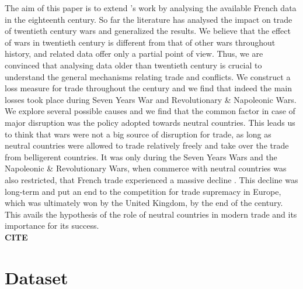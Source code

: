 \documentclass[12pt,a4paper,notitlepage,english]{article}
\begin{document}
The aim of this paper is to extend \cite{riley_seven_1986}’s work by analysing the available French data in the eighteenth century. So far the literature has analysed the impact on trade of twentieth century wars and generalized the results. We believe that the effect of wars in twentieth century is different from that of other wars throughout history, and related data offer only a partial point of view. Thus, we are convinced that analysing data older than twentieth century is crucial to understand the general mechanisms relating trade and conflicts. 
We construct a loss measure for trade throughout the century and we find that indeed the main losses took place during Seven Years War and Revolutionary \& Napoleonic Wars. We explore several possible causes and we find that the common factor in case of major disruption was the policy adopted towards neutral countries. This leads us to think that wars were not a big source of disruption for trade, as long as neutral countries were allowed to trade relatively freely and take over the trade from belligerent countries. It was only during the Seven Years Wars and the Napoleonic \& Revolutionary Wars, when commerce with neutral countries was also restricted, that French trade experienced a massive decline \citep{findlay2009power}. This decline was long-term and put an end to the competition for trade supremacy in Europe, which was ultimately won by the United Kingdom, by the end of the century. This avails the hypothesis of the role of neutral countries in modern trade and its importance for its success. \\
\textbf{CITE \cite{juhasz2014temporary}}

\section{Dataset} \label{dataset}
\end{document}

